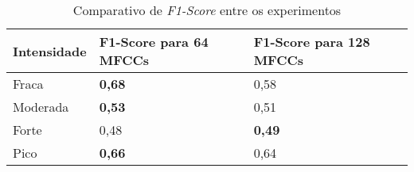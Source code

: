 
\begin{table}[]
    \centering
    \begin{tabular}{|l|l|l|}
    \hline
        Intensidade & F1-Score para 64 MFCCs & F1-Score para 128 MFCCs \\ \hline
        Fraca & \textbf{0,68} & 0,58 \\ \hline
        Moderada & \textbf{0,53} & 0,51 \\ \hline
        Forte & 0,48 & \textbf{0,49} \\ \hline
        Pico & \textbf{0,66} & 0,64 \\ \hline
    \end{tabular}
     \caption{\label{table:resultexp}Comparativo de \textit{F1-Score} entre os experimentos}
\end{table}


